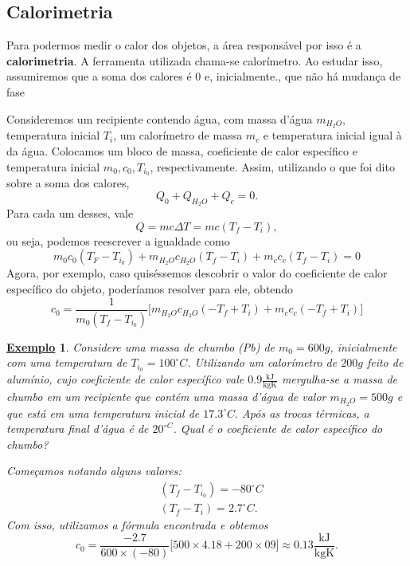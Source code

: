 \documentclass{article}
\newtheorem{example}{\underline{Exemplo}}
\begin{document}
\subsection{Calorimetria}
Para podermos medir o calor dos objetos, a área responsável por isso é a \textbf{calorimetria}. A ferramenta utilizada chama-se calorímetro.
Ao estudar isso, assumiremos que a soma dos calores é 0 e, inicialmente., que não há mudança de fase

Consideremos um recipiente contendo água, com massa d'água \(m_{H_{2}O},\) temperatura inicial \(T_{i}\), um calorímetro
de massa \(m_{c}\) e temperatura inicial igual à da água. Colocamos um bloco de massa, coeficiente de calor específico e temperatura inicial \(m_{0}, c_{0}, T_{i_{0}}\),
respectivamente. Assim, utilizando o que foi dito sobre a soma dos calores,
\[
  Q_{0} + Q_{H_{2}O} + Q_{c} = 0.
\]
Para cada um desses, vale 
\[
  Q = mc\Delta T = mc(T_{f}-T_{i}),
\]
ou seja, podemos reescrever a igualdade como 
\[
  m_{0}c_{0}(T_{F} - T_{i_{0}}) + m_{H_{2}O}c_{H_{2}O}(T_{f}-T_{i}) + m_{c}c_{c}(T_{f}-T_{i}) = 0
\]
Agora, por exemplo, caso quiséssemos descobrir o valor do coeficiente de calor específico do objeto, poderíamos resolver para ele, obtendo 
\[
  c_{0} = \frac{1}{m_{0}(T_{f}-T_{i_{0}})}\biggl[m_{H_{2}O}c_{H_{2}O}(-T_{f}+T_{i}) + m_{c}c_{c}(-T_{f}+T_{i})\biggr]
\]
\begin{example}
  Considere uma massa de chumbo (Pb) de \(m_{0} = 600g\), inicialmente com uma temperatura de \(T_{i_{0}} = 100^{\circ{}}C\). Utilizando um calorímetro de
  \(200g\) feito de alumínio, cujo coeficiente de calor específico vale \(0.9\frac{\text{kJ}}{\text{kgK}}\) mergulha-se a massa de chumbo em um recipiente que contém uma massa d'água de valor \(m_{H_{2}O}=500g\) e
  que está em uma temperatura inicial de \(17.3^{\circ{}}C.\) Após as trocas térmicas, a temperatura final d'água é de \(20^{\circ{}C}\). Qual é o coeficiente
  de calor específico do chumbo?

  Começamos notando alguns valores:
  \begin{align*}
   &(T_{f}-T_{i_{0}}) = -80^{\circ{}}C\\
   &(T_{f}-T_{i}) = 2.7^{\circ{}}C.
  \end{align*}
  Com isso, utilizamos a fórmula encontrada e obtemos 
  \[
    c_{0} = \frac{-2.7}{600\times(-80)}\biggl[500\times 4.18 + 200\times 09\biggr]\approx 0.13 \frac{\text{kJ}}{\text{kgK}}.
  \]
\end{example}
\end{document}
